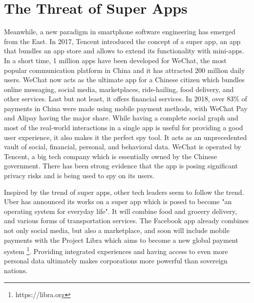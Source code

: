 \section{The Threat of Super Apps}

Meanwhile, a new paradigm in smartphone software engineering has emerged from the East. In 2017, Tencent introduced the concept of a super app, an app that bundles an app store and allows to extend its functionality with mini-apps. In a short time, 1 million apps have been developed for WeChat, the most popular communication platform in China and it has attracted 200 million daily users. \cite{wechatapps} WeChat now acts as the ultimate app for a Chinese citizen which bundles online messaging, social media, marketplaces, ride-hailing, food delivery, and other services. Last but not least, it offers financial services. In 2018, over 83\% of payments in China were made using mobile payment methods, with WeChat Pay and Alipay having the major share. \cite{chinapayments} While having a complete social graph and most of the real-world interactions in a single app is useful for providing a good user experience, it also makes it the perfect spy tool. It acts as an unprecedented vault of social, financial, personal, and behavioral data. WeChat is operated by Tencent, a big tech company which is essentially owned by the Chinese government. There has been strong evidence that the app is posing significant privacy risks and is being used to spy on its users. \cite{wechatspy}

Inspired by the trend of super apps, other tech leaders seem to follow the trend. Uber has announced its works on a super app which is posed to become "an operating system for everyday life". It will combine food and grocery delivery, and various forms of transportation services. \cite{superuber} The Facebook app already combines not only social media, but also a marketplace, and soon will include mobile payments with the Project Libra which aims to become a new global payment system \footnote{https://libra.org}. Providing integrated experiences and having access to even more personal data ultimately makes corporations more powerful than sovereign nations.



